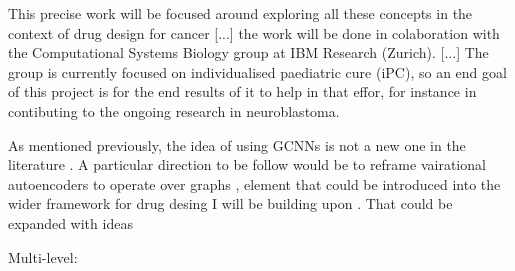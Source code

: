 \documentclass{article}
\begin{document}
This precise work will be focused around exploring all these concepts in the context of
drug design for cancer [...] the work will be done in colaboration with the
Computational Systems Biology group at IBM Research (Zurich). [...] The group is
currently focused on individualised paediatric cure (iPC), so an end goal of this
project is for the end results of it to help in that effor, for instance in contibuting
to the ongoing research in neuroblastoma.

As mentioned previously, the idea of using GCNNs is not a new one in the literature
\cite{Sun2019}. A particular direction to be follow would be to reframe vairational
autoencoders to operate over graphs \cite{Simonovsky2018,Li2018}, element that could be
introduced into the wider framework for drug desing I will be building upon
\cite{Born2019}. That could be expanded with ideas 

Multi-level:


\end{document}
